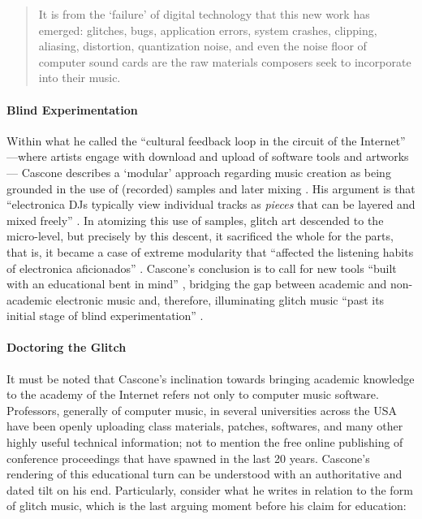 \begin{quote}
	It is from the `failure' of digital technology that this new work has emerged: glitches, bugs, application errors, system crashes, clipping, aliasing, distortion, quantization noise, and even the noise floor of computer sound cards are the raw materials composers seek to incorporate into their music. \parencite[13]{Cas00:The}
\end{quote}

\paragraph{Blind Experimentation}
Within what he called the ``cultural feedback loop in the circuit of the Internet'' ---where artists engage with download and upload of software tools and artworks--- Cascone describes a `modular' approach regarding music creation as being grounded in the use of (recorded) samples and later mixing \parencite[17]{Cas00:The}. His argument is that ``electronica DJs typically view individual tracks as \textit{pieces} that can be layered and mixed freely'' \im \parencite[17]{Cas00:The}. In atomizing this use of samples, glitch art descended to the micro-level, but precisely by this descent, it sacrificed the whole for the parts, that is, it became a case of extreme modularity that ``affected the listening habits of electronica aficionados'' \parencite[17]{Cas00:The}. Cascone's conclusion is to call for new tools ``built with an educational bent in mind'' \parencite[17]{Cas00:The}, bridging the gap between academic and non-academic electronic music and, therefore, illuminating glitch music ``past its initial stage of blind experimentation'' \parencite[17]{Cas00:The}. 

\paragraph{Doctoring the Glitch}
It must be noted that Cascone's inclination towards bringing academic knowledge to the academy of the Internet refers not only to computer music software. Professors, generally of computer music, in several universities across the USA have been openly uploading class materials, patches, softwares, and many other highly useful technical information; not to mention the free online publishing of conference proceedings that have spawned in the last 20 years. Cascone's rendering of this educational turn can be understood with an authoritative and dated tilt on his end. Particularly, consider what he writes in relation to the form of glitch music, which is the last arguing moment before his claim for education:


